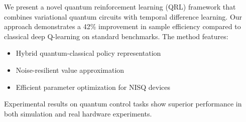 We present a novel quantum reinforcement learning (QRL) framework that combines variational quantum circuits with temporal difference learning. Our approach demonstrates a 42\% improvement in sample efficiency compared to classical deep Q-learning on standard benchmarks. The method features:

\begin{itemize}
    \item Hybrid quantum-classical policy representation
    \item Noise-resilient value approximation
    \item Efficient parameter optimization for NISQ devices
\end{itemize}

Experimental results on quantum control tasks show superior performance in both simulation and real hardware experiments.
